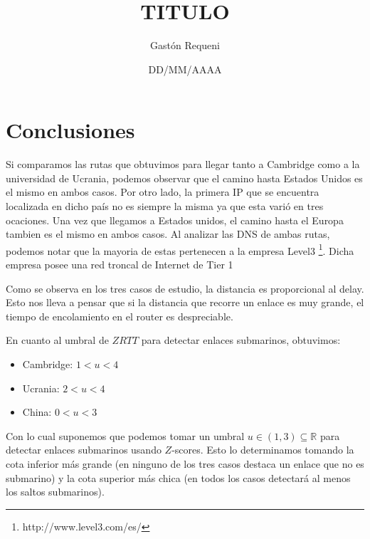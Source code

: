 \documentclass[a4paper,11pt]{article}
\author{Gastón Requeni}
\title{TITULO}
\date{DD/MM/AAAA}
\begin{document}

\newpage

\tableofcontents
\newpage


\newpage


\newpage


\newpage


\newpage

\section{Conclusiones}
Si comparamos las rutas que obtuvimos para llegar tanto a Cambridge como a la universidad de Ucrania, podemos observar que el camino hasta Estados Unidos es el mismo en ambos casos. Por otro lado, la primera IP que se encuentra localizada en dicho país no es siempre la misma ya que esta varió en tres ocaciones. Una vez que llegamos a Estados unidos, el camino hasta el Europa tambien es el mismo en ambos casos. 
Al analizar las DNS de ambas rutas, podemos notar que la mayoria de estas pertenecen a la empresa Level3 \footnote{http://www.level3.com/es/}. Dicha empresa posee una red troncal de Internet de Tier 1

Como se observa en los tres casos de estudio, la distancia es proporcional al delay. Esto nos lleva a pensar que si la distancia que recorre un enlace es muy grande, el tiempo de encolamiento en el router es despreciable.

En cuanto al umbral de $ZRTT$ para detectar enlaces submarinos, obtuvimos:
\begin{itemize}
 \item Cambridge: $1<u<4$
 \item Ucrania: $2<u<4$
 \item China: $0<u<3$
\end{itemize}
Con lo cual suponemos que podemos tomar un umbral $u\in (1,3)\subseteq \mathbb{R}$ para detectar enlaces submarinos usando $Z$-scores.
Esto lo determinamos tomando la cota inferior más grande (en ninguno de los tres casos destaca un enlace que no es submarino) y la cota
superior más chica (en todos los casos detectará al menos los saltos submarinos).

\newpage


\end{document}

